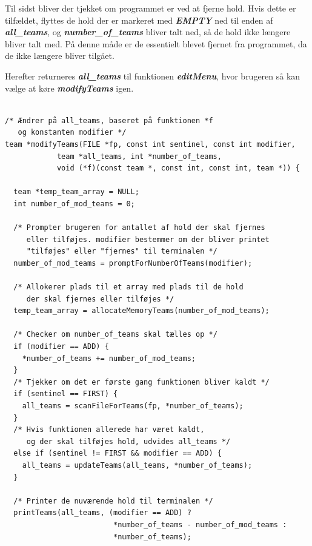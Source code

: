 \par
Til sidst bliver der tjekket om programmet er ved at fjerne hold. Hvis dette er tilfældet, flyttes de hold der er markeret med \textbf{\textit{EMPTY}} ned til enden af \textbf{\textit{all\_teams}}, og \textbf{\textit{number\_of\_teams}} bliver talt ned, så de hold ikke længere bliver talt med. På denne måde er de essentielt blevet fjernet fra programmet, da de ikke længere bliver tilgået. 
\par
Herefter returneres \textbf{\textit{all\_teams}} til funktionen \textbf{\textit{editMenu}}, hvor brugeren så kan vælge at køre \textbf{\textit{modifyTeams}} igen. 


\begin{listing}[H]
\begin{verbatim}

/* Ændrer på all_teams, baseret på funktionen *f 
   og konstanten modifier */
team *modifyTeams(FILE *fp, const int sentinel, const int modifier, 
            team *all_teams, int *number_of_teams, 
            void (*f)(const team *, const int, const int, team *)) {
                  
  team *temp_team_array = NULL;
  int number_of_mod_teams = 0;

  /* Prompter brugeren for antallet af hold der skal fjernes 
     eller tilføjes. modifier bestemmer om der bliver printet 
     "tilføjes" eller "fjernes" til terminalen */
  number_of_mod_teams = promptForNumberOfTeams(modifier);

  /* Allokerer plads til et array med plads til de hold 
     der skal fjernes eller tilføjes */
  temp_team_array = allocateMemoryTeams(number_of_mod_teams);

  /* Checker om number_of_teams skal tælles op */
  if (modifier == ADD) {
    *number_of_teams += number_of_mod_teams;
  }
  /* Tjekker om det er første gang funktionen bliver kaldt */
  if (sentinel == FIRST) {
    all_teams = scanFileForTeams(fp, *number_of_teams);
  }
  /* Hvis funktionen allerede har været kaldt, 
     og der skal tilføjes hold, udvides all_teams */
  else if (sentinel != FIRST && modifier == ADD) {
    all_teams = updateTeams(all_teams, *number_of_teams);
  }

  /* Printer de nuværende hold til terminalen */
  printTeams(all_teams, (modifier == ADD) ? 
                         *number_of_teams - number_of_mod_teams : 
                         *number_of_teams);


\end{verbatim}
\end{listing}

